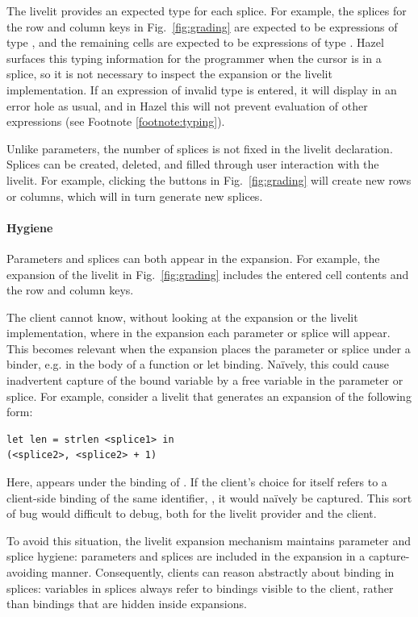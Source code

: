 The livelit provides an expected type for each splice.
For example, the splices for the row and column keys in Fig.~\ref{fig:grading} are expected to be expressions
of type , and the remaining cells are expected to be expressions of type .
Hazel surfaces this typing information for the programmer when the cursor is in a splice,
so it is not necessary to inspect the expansion or the livelit implementation.
If an expression of invalid type is entered, it will display in an error hole as usual,
and in Hazel this will not prevent evaluation of other expressions (see Footnote \ref{footnote:typing}).

Unlike parameters, the number of splices is not fixed in the livelit declaration. Splices can be created,
deleted, and filled through user interaction with the livelit. For example, clicking the \li{+} buttons
in Fig.~\ref{fig:grading} will create new rows or columns, which will in turn generate new splices.

\paragraph{Hygiene}\label{sec:hygiene}
Parameters and splices can both appear in the expansion. For example,
the expansion of the  livelit in Fig.~\ref{fig:grading} includes the
entered cell contents and the row and column keys.

The client cannot know, without looking at the expansion or the livelit implementation,
where in the expansion each parameter or splice will appear. This becomes relevant when
the expansion places the parameter or splice under a binder, e.g. in the body of a function or let binding.
Na\"ively, this could cause inadvertent capture of the bound variable by a free variable
in the parameter or splice. For example, consider a livelit that generates an expansion
of the following form:
\begin{lstlisting}[numbers=none]
let len = strlen <splice1> in
(<splice2>, <splice2> + 1)
\end{lstlisting}
Here,  appears under the binding of . If the client's choice for
 itself refers to a client-side binding of the same identifier, ,
it would na\"ively be captured. This sort of bug would difficult to debug,
both for the livelit provider and the client.

To avoid this situation, the livelit expansion mechanism
maintains parameter and splice hygiene: parameters and splices are included in the expansion
in a capture-avoiding manner.
Consequently, clients can reason abstractly about binding in splices: variables in splices
always refer to bindings visible to the client, rather than bindings that are hidden inside expansions.

